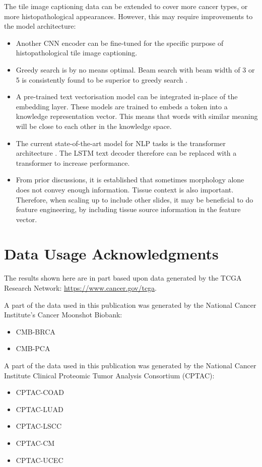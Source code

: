 \documentclass{l4proj}
\begin{document}
The tile image captioning data can be extended to cover more cancer types, or more histopathological appearances. However, this may require improvements to the model architecture:
\begin{itemize}
    \item Another CNN encoder can be fine-tuned for the specific purpose of histopathological tile image captioning.
    \item Greedy search is by no means optimal. Beam search with beam width of 3 or 5 is consistently found to be superior to greedy search \citep{cohen2019, kumar2022}.
    \item A pre-trained text vectorisation model can be integrated in-place of the embedding layer. These models are trained to embeds a token into a knowledge representation vector. This means that words with similar meaning will be close to each other in the knowledge space.
    \item The current state-of-the-art model for NLP tasks is the transformer architecture \citep{vaswani2023}. The LSTM text decoder therefore can be replaced with a transformer to increase performance.
    \item From prior discussions, it is established that sometimes morphology alone does not convey enough information. Tissue context is also important. Therefore, when scaling up to include other slides, it may be beneficial to do feature engineering, by including tissue source information in the feature vector.
\end{itemize}

\section{Data Usage Acknowledgments}

The results shown here are in part based upon data generated by the TCGA Research Network: \url{https://www.cancer.gov/tcga}.

A part of the data used in this publication was generated by the National Cancer Institute’s Cancer Moonshot Biobank:
\begin{itemize}
    \item CMB-BRCA \citep{cmb-brca}
    \item CMB-PCA \citep{cmb-pca}
\end{itemize}

A part of the data used in this publication was generated by the National Cancer Institute Clinical Proteomic Tumor Analysis Consortium (CPTAC):
\begin{itemize}
    \item CPTAC-COAD \citep{cptac-coad}
    \item CPTAC-LUAD \citep{cptac-luad}
    \item CPTAC-LSCC \citep{cptac-lscc}
    \item CPTAC-CM \citep{cptac-cm}
    \item CPTAC-UCEC \citep{cptac-ucec}
\end{itemize}
\end{document}
